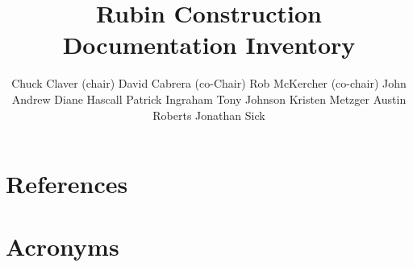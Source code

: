 \documentclass[SE,lsstdraft,authoryear,toc]{lsstdoc}
\title{Rubin Construction Documentation Inventory}
\author{%
Chuck Claver (chair)
David Cabrera (co-Chair)
Rob McKercher (co-chair)
John Andrew
Diane Hascall
Patrick Ingraham
Tony Johnson
Kristen Metzger
Austin Roberts
Jonathan Sick
}
\date{\vcsDate}
\begin{document}
\maketitle












% 

\newpage
\appendix
\section{References} \label{sec:bib}
\renewcommand{\refname}{} %


\section{Acronyms} \label{sec:acronyms}

\end{document}
